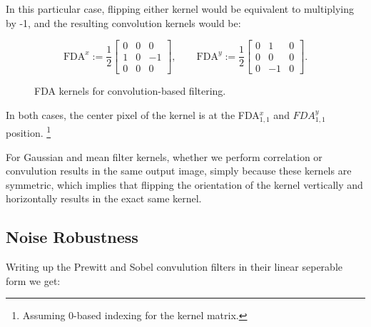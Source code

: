 In this particular case, flipping either kernel would be equivalent to multiplying by -1, and the resulting convolution kernels would be:

\begin{figure}[H]
	\begin{equation}
		\text{FDA}^x:=
		\frac{1}{2}
		\begin{bmatrix}
			0 & 0 & 0 \\	
			1 & 0 & -1 \\
			0 & 0 & 0
		\end{bmatrix},
		\qquad
		\text{FDA}^y:=
		\frac{1}{2}
		\begin{bmatrix}
			0 & 1 & 0 \\	
			0 & 0 & 0 \\
			0 & -1 & 0
		\end{bmatrix}.
	\end{equation}
	\caption{FDA kernels for convolution-based filtering.}
\end{figure}

In both cases, the center pixel of the kernel is at the FDA$^x_{1,1}$ and $FDA^y_{1,1}$ position.
\footnote{
	Assuming 0-based indexing for the kernel matrix.
}

For Gaussian and mean filter kernels, whether we perform correlation or convulution results in the same output image,
simply because these kernels are symmetric, which implies that flipping the orientation of the kernel vertically and horizontally
results in the exact same kernel.

\subsection{Noise Robustness}

Writing up the Prewitt and Sobel convulution filters in their linear seperable form we get:


